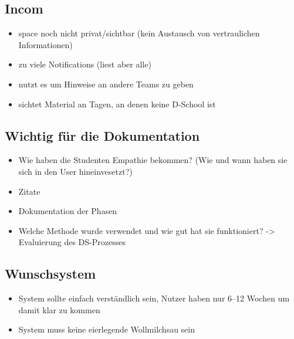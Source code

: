 \subsection*{Incom}
\label{incom}

\begin{itemize}
\item space noch nicht privat\slash sichtbar (kein Austausch von vertraulichen Informationen)
\item zu viele Notifications (liest aber alle)
\item nutzt es um Hinweise an andere Teams zu geben
\item sichtet Material an Tagen, an denen keine D-School ist
\end{itemize}

\subsection*{Wichtig für die Dokumentation}
\label{wichtigfuerdiedokumentation}

\begin{itemize}
\item Wie haben die Studenten Empathie bekommen? (Wie und wann haben sie sich in den User hineinvesetzt?)
\item Zitate
\item Dokumentation der Phasen
\item Welche Methode wurde verwendet und wie gut hat sie funktioniert? -> Evaluierung des DS-Prozesses
\end{itemize}

\subsection*{Wunschsystem}
\label{wunschsystem}

\begin{itemize}
\item System sollte einfach verständlich sein, Nutzer haben nur 6--12 Wochen um damit klar zu kommen
\item System muss keine eierlegende Wollmilchsau sein
\end{itemize}


